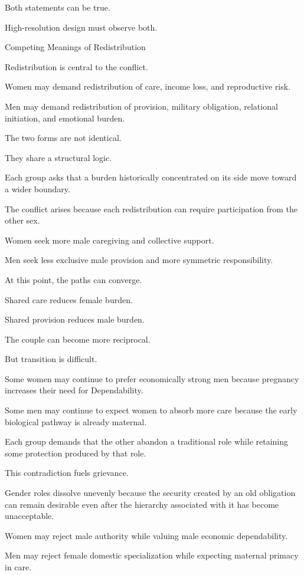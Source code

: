 Both statements can be true.

High-resolution design must observe both.

Competing Meanings of Redistribution

Redistribution is central to the conflict.

Women may demand redistribution of care, income loss, and reproductive risk.

Men may demand redistribution of provision, military obligation, relational initiation, and emotional burden.

The two forms are not identical.

They share a structural logic.

Each group asks that a burden historically concentrated on its side move toward a wider boundary.

The conflict arises because each redistribution can require participation from the other sex.

Women seek more male caregiving and collective support.

Men seek less exclusive male provision and more symmetric responsibility.

At this point, the paths can converge.

Shared care reduces female burden.

Shared provision reduces male burden.

The couple can become more reciprocal.

But transition is difficult.

Some women may continue to prefer economically strong men because pregnancy increases their need for Dependability.

Some men may continue to expect women to absorb more care because the early biological pathway is already maternal.

Each group demands that the other abandon a traditional role while retaining some protection produced by that role.

This contradiction fuels grievance.

Gender roles dissolve unevenly because the security created by an old obligation can remain desirable even after the hierarchy associated with it has become unacceptable.

Women may reject male authority while valuing male economic dependability.

Men may reject female domestic specialization while expecting maternal primacy in care.

